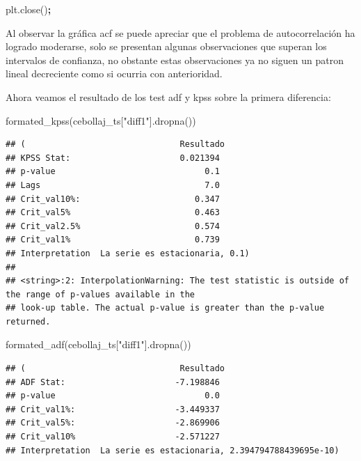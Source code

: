 \documentclass[
]{book}
\newenvironment{Shaded}{\begin{snugshade}}{\end{snugshade}}
\newcommand{\NormalTok}[1]{#1}
\newcommand{\OperatorTok}[1]{\textcolor[rgb]{0.81,0.36,0.00}{\textbf{#1}}}
\newcommand{\StringTok}[1]{\textcolor[rgb]{0.31,0.60,0.02}{#1}}
\begin{document}
\begin{Shaded}
\begin{Highlighting}[]
\NormalTok{plt.close()}\OperatorTok{;}
\end{Highlighting}
\end{Shaded}

Al observar la gráfica acf se puede apreciar que el problema de autocorrelación ha logrado moderarse, solo se presentan algunas observaciones que superan los intervalos de confianza, no obstante estas observaciones ya no siguen un patron lineal decreciente como si ocurria con anterioridad.

Ahora veamos el resultado de los test adf y kpss sobre la primera diferencia:

\begin{Shaded}
\begin{Highlighting}[]

\NormalTok{formated\_kpss(cebollaj\_ts[}\StringTok{"diff1"}\NormalTok{].dropna())}
\end{Highlighting}
\end{Shaded}

\begin{verbatim}
## (                               Resultado
## KPSS Stat:                      0.021394
## p-value                              0.1
## Lags                                 7.0
## Crit_val10%:                       0.347
## Crit_val5%                         0.463
## Crit_val2.5%                       0.574
## Crit_val1%                         0.739
## Interpretation  La serie es estacionaria, 0.1)
## 
## <string>:2: InterpolationWarning: The test statistic is outside of the range of p-values available in the
## look-up table. The actual p-value is greater than the p-value returned.
\end{verbatim}

\begin{Shaded}
\begin{Highlighting}[]
\NormalTok{formated\_adf(cebollaj\_ts[}\StringTok{"diff1"}\NormalTok{].dropna())}
\end{Highlighting}
\end{Shaded}

\begin{verbatim}
## (                               Resultado
## ADF Stat:                      -7.198846
## p-value                              0.0
## Crit_val1%:                    -3.449337
## Crit_val5%:                    -2.869906
## Crit_val10%                    -2.571227
## Interpretation  La serie es estacionaria, 2.394794788439695e-10)
\end{verbatim}
\end{document}
